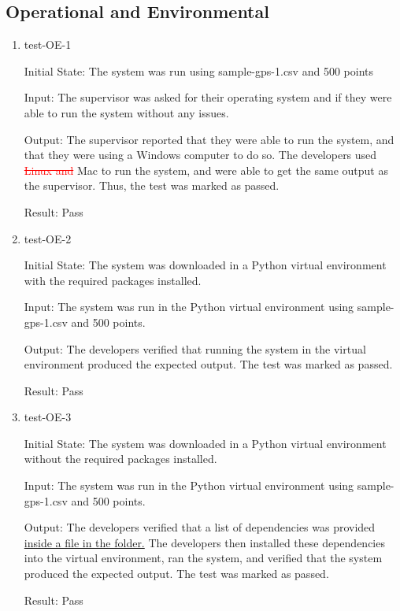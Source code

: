 \documentclass[12pt, titlepage]{article}
\begin{document}
\subsection{Operational and Environmental}
\begin{enumerate}
\item{test-OE-1} \label{test-OE-1}

Initial State: The system was run using sample-gps-1.csv and 500 points

Input: The supervisor was asked for their operating system and if they were able to run the system without any issues.

Output: The supervisor reported that they were able to run the system, and that they were using a Windows computer to do so. The developers used \textcolor{red}{\sout{Linux and}} Mac to run the system, and were able to get the same output as the supervisor. Thus, the test was marked as passed.

Result: Pass

\item{test-OE-2} \label{test-OE-2}

Initial State: The system was downloaded in a Python virtual environment with the required packages installed.

Input: The system was run in the Python virtual environment using sample-gps-1.csv and 500 points.

Output: The developers verified that running the system in the virtual environment produced the expected output. The test was marked as passed.

Result: Pass

\item{test-OE-3} \label{test-OE-3}

Initial State: The system was downloaded in a Python virtual environment without the required packages installed.

Input: The system was run in the Python virtual environment using sample-gps-1.csv and 500 points.

Output: The developers verified that a list of dependencies was provided \href{https://github.com/paezha/PyERT-BLACK/blob/main/src/PyERT_environment.yaml}{inside a file in the folder.} The developers then installed these dependencies into the virtual environment, ran the system, and verified that the system produced the expected output. The test was marked as passed.

Result: Pass

\end{enumerate}	
\end{document}
